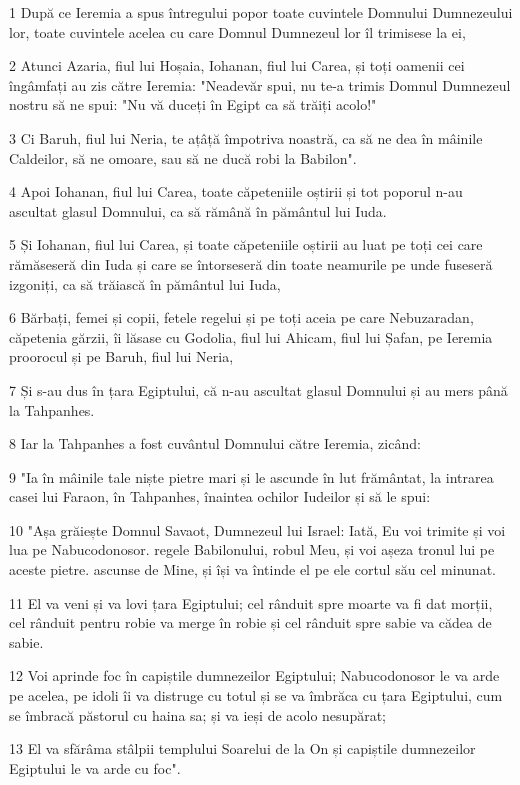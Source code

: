 \par 1 După ce Ieremia a spus întregului popor toate cuvintele Domnului Dumnezeului lor, toate cuvintele acelea cu care Domnul Dumnezeul lor îl trimisese la ei,
\par 2 Atunci Azaria, fiul lui Hoșaia, Iohanan, fiul lui Carea, și toți oamenii cei îngâmfați au zis către Ieremia: "Neadevăr spui, nu te-a trimis Domnul Dumnezeul nostru să ne spui: "Nu vă duceți în Egipt ca să trăiți acolo!"
\par 3 Ci Baruh, fiul lui Neria, te ațâță împotriva noastră, ca să ne dea în mâinile Caldeilor, să ne omoare, sau să ne ducă robi la Babilon".
\par 4 Apoi Iohanan, fiul lui Carea, toate căpeteniile oștirii și tot poporul n-au ascultat glasul Domnului, ca să rămână în pământul lui Iuda.
\par 5 Și Iohanan, fiul lui Carea, și toate căpeteniile oștirii au luat pe toți cei care rămăseseră din Iuda și care se întorseseră din toate neamurile pe unde fuseseră izgoniți, ca să trăiască în pământul lui Iuda,
\par 6 Bărbați, femei și copii, fetele regelui și pe toți aceia pe care Nebuzaradan, căpetenia gărzii, îi lăsase cu Godolia, fiul lui Ahicam, fiul lui Șafan, pe Ieremia proorocul și pe Baruh, fiul lui Neria,
\par 7 Și s-au dus în țara Egiptului, că n-au ascultat glasul Domnului și au mers până la Tahpanhes.
\par 8 Iar la Tahpanhes a fost cuvântul Domnului către Ieremia, zicând:
\par 9 "Ia în mâinile tale niște pietre mari și le ascunde în lut frământat, la intrarea casei lui Faraon, în Tahpanhes, înaintea ochilor Iudeilor și să le spui:
\par 10 "Așa grăiește Domnul Savaot, Dumnezeul lui Israel: Iată, Eu voi trimite și voi lua pe Nabucodonosor. regele Babilonului, robul Meu, și voi așeza tronul lui pe aceste pietre. ascunse de Mine, și își va întinde el pe ele cortul său cel minunat.
\par 11 El va veni și va lovi țara Egiptului; cel rânduit spre moarte va fi dat morții, cel rânduit pentru robie va merge în robie și cel rânduit spre sabie va cădea de sabie.
\par 12 Voi aprinde foc în capiștile dumnezeilor Egiptului; Nabucodonosor le va arde pe acelea, pe idoli îi va distruge cu totul și se va îmbrăca cu țara Egiptului, cum se îmbracă păstorul cu haina sa; și va ieși de acolo nesupărat;
\par 13 El va sfărâma stâlpii templului Soarelui de la On și capiștile dumnezeilor Egiptului le va arde cu foc".

